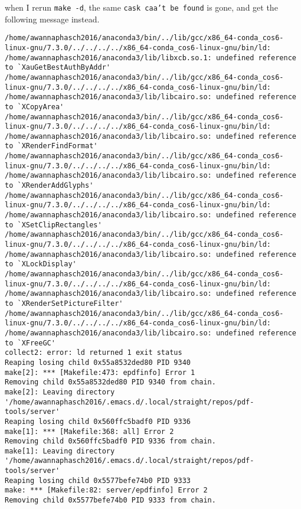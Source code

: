 \documentclass[11pt]{article}
\begin{document}
\begin{enumerate}
\begin{enumerate}
when I rerun \texttt{make -d}, the same \texttt{cask caa't be found} is gone, and get the following message instead.
\begin{verbatim}
/home/awannaphasch2016/anaconda3/bin/../lib/gcc/x86_64-conda_cos6-linux-gnu/7.3.0/../../../../x86_64-conda_cos6-linux-gnu/bin/ld: /home/awannaphasch2016/anaconda3/lib/libxcb.so.1: undefined reference to `XauGetBestAuthByAddr'
/home/awannaphasch2016/anaconda3/bin/../lib/gcc/x86_64-conda_cos6-linux-gnu/7.3.0/../../../../x86_64-conda_cos6-linux-gnu/bin/ld: /home/awannaphasch2016/anaconda3/lib/libcairo.so: undefined reference to `XCopyArea'
/home/awannaphasch2016/anaconda3/bin/../lib/gcc/x86_64-conda_cos6-linux-gnu/7.3.0/../../../../x86_64-conda_cos6-linux-gnu/bin/ld: /home/awannaphasch2016/anaconda3/lib/libcairo.so: undefined reference to `XRenderFindFormat'
/home/awannaphasch2016/anaconda3/bin/../lib/gcc/x86_64-conda_cos6-linux-gnu/7.3.0/../../../../x86_64-conda_cos6-linux-gnu/bin/ld: /home/awannaphasch2016/anaconda3/lib/libcairo.so: undefined reference to `XRenderAddGlyphs'
/home/awannaphasch2016/anaconda3/bin/../lib/gcc/x86_64-conda_cos6-linux-gnu/7.3.0/../../../../x86_64-conda_cos6-linux-gnu/bin/ld: /home/awannaphasch2016/anaconda3/lib/libcairo.so: undefined reference to `XSetClipRectangles'
/home/awannaphasch2016/anaconda3/bin/../lib/gcc/x86_64-conda_cos6-linux-gnu/7.3.0/../../../../x86_64-conda_cos6-linux-gnu/bin/ld: /home/awannaphasch2016/anaconda3/lib/libcairo.so: undefined reference to `XLockDisplay'
/home/awannaphasch2016/anaconda3/bin/../lib/gcc/x86_64-conda_cos6-linux-gnu/7.3.0/../../../../x86_64-conda_cos6-linux-gnu/bin/ld: /home/awannaphasch2016/anaconda3/lib/libcairo.so: undefined reference to `XRenderSetPictureFilter'
/home/awannaphasch2016/anaconda3/bin/../lib/gcc/x86_64-conda_cos6-linux-gnu/7.3.0/../../../../x86_64-conda_cos6-linux-gnu/bin/ld: /home/awannaphasch2016/anaconda3/lib/libcairo.so: undefined reference to `XFreeGC'
collect2: error: ld returned 1 exit status
Reaping losing child 0x55a8532ded80 PID 9340
make[2]: *** [Makefile:473: epdfinfo] Error 1
Removing child 0x55a8532ded80 PID 9340 from chain.
make[2]: Leaving directory '/home/awannaphasch2016/.emacs.d/.local/straight/repos/pdf-tools/server'
Reaping losing child 0x560ffc5badf0 PID 9336
make[1]: *** [Makefile:368: all] Error 2
Removing child 0x560ffc5badf0 PID 9336 from chain.
make[1]: Leaving directory '/home/awannaphasch2016/.emacs.d/.local/straight/repos/pdf-tools/server'
Reaping losing child 0x5577befe74b0 PID 9333
make: *** [Makefile:82: server/epdfinfo] Error 2
Removing child 0x5577befe74b0 PID 9333 from chain.
\end{verbatim}


\end{enumerate}
\end{enumerate}
\end{document}
